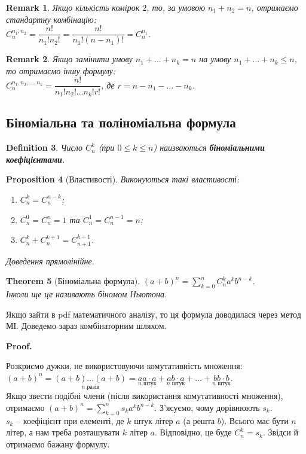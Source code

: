 \documentclass[a4paper, 14pt]{extarticle}
\makeatletter
\theoremstyle{theoremdd}
\newtheorem{theorem}{Theorem}[subsection]
\theoremstyle{theoremdd}
\newtheorem{definition}[theorem]{Definition}
\theoremstyle{theoremdd}
\theoremstyle{theoremdd}
\theoremstyle{theoremdd}
\theoremstyle{theoremdd}
\theoremstyle{theoremdd}
\theoremstyle{theoremdd}
\theoremstyle{theoremdd}
\newtheorem{proposition}[theorem]{Proposition}
\theoremstyle{theoremdd}
\theoremstyle{theoremdd}
\newtheorem{remark}[theorem]{Remark}
\theoremstyle{theoremdd}
\theoremstyle{theoremdd}
\theoremstyle{theoremdd}
\theoremstyle{theoremdd}
\renewenvironment{proof}[1][Proof.\\]{\par
\pushQED{\hfill \qed}%
\normalfont \topsep6\p@\@plus6\p@\relax
\trivlist
\item\relax
{\bfseries
#1\@addpunct{.}}\hspace\labelsep\ignorespaces
}{%
\popQED\endtrivlist\@endpefalse
}
\makeatother
\begin{document}
\begin{remark}
Якщо кількість комірок $2$, то, за умовою $n_1 + n_2 = n$, отримаємо стандартну комбінацію:\\
$C_n^{n_1,n_2} = \dfrac{n!}{n_1! n_2!} = \dfrac{n!}{n_1! (n-n_1)!} = C_n^{n_1}$.
\end{remark}

\begin{remark}
Якщо замінити умову $n_1 + \dots + n_k = n$ на умову $n_1 + \dots + n_k \leq n$, то отримаємо іншу формулу:\\
$C_n^{n_1,n_2,\dots,n_k} = \dfrac{n!}{n_1! n_2! \dots n_k! r!}$, де $r = n - n_1 - \dots - n_k$.
\end{remark}

\subsection{Біноміальна та поліноміальна формула}
\begin{definition}
Число $C_n^k$ (при $0 \leq k \leq n$) наизваються \textbf{біноміальними коефіцієнтами}.
\end{definition}

\begin{proposition}[Властивості]
Виконуються такі властивості:
\begin{enumerate}[nosep, wide=0pt, label={\arabic*)}]
\item $C_n^k = C_n^{n-k}$;
\item $C_n^0 = C_n^n = 1$ та $C_n^1 = C_n^{n-1} = n$;
\item $C_n^k + C_n^{k+1} = C_{n+1}^{k+1}$.
\end{enumerate}
\textit{Доведення прямолінійне.}
\end{proposition}

\begin{theorem}[Біноміальна формула]
$(a+b)^n = \displaystyle\sum_{k=0}^n C_n^k a^k b^{n-k}$.\\
\textit{Інколи ще це називають біномом Ньютона.}
\end{theorem}
Якщо зайти в pdf математичного аналізу, то ця формула доводилася через метод МІ. Доведемо зараз комбінаторним шляхом.

\begin{proof}
Розкриємо дужки, не використовуючи комутативність множення:\\
$(a+b)^n = \underset{n \text{ разів}}{(a+b) \dots (a+b)} = \underset{n \text{ штук}}{aa \cdot a} + \underset{n \text{ штук}}{ab \cdot a} + \dots + \underset{n \text{ штук}}{bb \cdot b}$.\\
Якщо звести подібні члени (після використання комутативності множення), отримаємо $(a+b)^n = \displaystyle\sum_{k=0}^n s_k a^k b^{n-k}$. З'ясуємо, чому дорівнюють $s_k$.\\
$s_k$ -- коефіцієнт при елементі, де $k$ штук літер $a$ (а решта $b$). Всього має бути $n$ літер, а нам треба розташувати $k$ літер $a$. Відповідно, це буде $C_n^k = s_k$. Звідси й отримаємо бажану формулу.
\end{proof}
\end{document}
